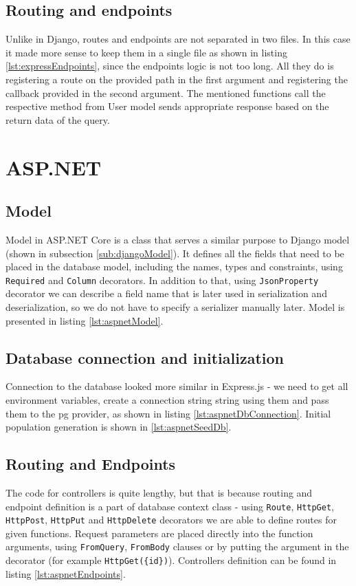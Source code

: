 \subsection{Routing and endpoints}
Unlike in Django, routes and endpoints are not separated in two files. In this case it made more sense to keep them in a single file as shown in listing \ref{lst:expressEndpoints}, since the endpoints logic is not too long. All they do is registering a route on the provided path in the first argument and registering the callback provided in the second argument. The mentioned functions call the respective method from User model sends appropriate response based on the return data of the query.


%
%
\section{ASP.NET}
\subsection{Model}
Model in ASP.NET Core is a class that serves a similar purpose to Django model (shown in subsection \ref{sub:djangoModel}). It defines all the fields that need to be placed in the database model, including the names, types and constraints, using \lstinline{Required} and \lstinline{Column} decorators. In addition to that, using \lstinline{JsonProperty} decorator we can describe a field name that is later used in serialization and deserialization, so we do not have to specify a serializer manually later. Model is presented in listing \ref{lst:aspnetModel}.


\subsection{Database connection and initialization}
Connection to the database looked more similar in Express.js - we need to get all environment variables, create a connection string string using them and pass them to the \acrlong{pg} provider, as shown in listing \ref{lst:aspnetDbConnection}. Initial population generation is shown in \ref{lst:aspnetSeedDb}.



\subsection{Routing and Endpoints}
The code for controllers is quite lengthy, but that is because routing and endpoint definition is a part of database context class - using \lstinline{Route}, \lstinline{HttpGet}, \lstinline{HttpPost}, \lstinline{HttpPut} and \lstinline{HttpDelete} decorators we are able to define routes for given functions. Request parameters are placed directly into the function arguments, using \lstinline{FromQuery}, \lstinline{FromBody} clauses or by putting the argument in the decorator (for example \lstinline[mathescape]!HttpGet({id})!). Controllers definition can be found in listing \ref{lst:aspnetEndpoints}.


